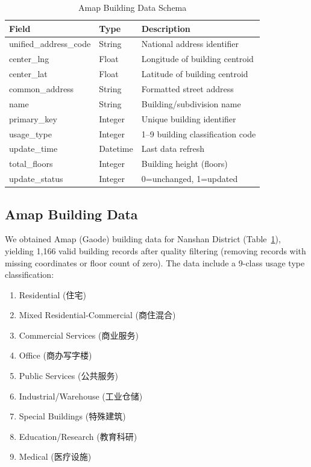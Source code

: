 \documentclass[journal]{IEEEtran}
\begin{document}
\begin{table}[!h]
\caption{Amap Building Data Schema}
\label{tab:schema}
\centering
\begin{tabular}{llp{5.5cm}}
\toprule
\textbf{Field} & \textbf{Type} & \textbf{Description} \\
\midrule
unified\_address\_code & String & National address identifier \\
center\_lng & Float & Longitude of building centroid \\
center\_lat & Float & Latitude of building centroid \\
common\_address & String & Formatted street address \\
name & String & Building/subdivision name \\
primary\_key & Integer & Unique building identifier \\
usage\_type & Integer & 1--9 building classification code \\
update\_time & Datetime & Last data refresh \\
total\_floors & Integer & Building height (floors) \\
update\_status & Integer & 0=unchanged, 1=updated \\
\bottomrule
\end{tabular}
\end{table}

\subsection{Amap Building Data}
We obtained Amap (Gaode) building data for Nanshan District (Table~\ref{tab:schema}), yielding 1,166 valid building records after quality filtering (removing records with missing coordinates or floor count of zero). The data include a 9-class usage type classification:
\begin{enumerate}
    \itemsep0pt
    \item Residential (住宅)
    \item Mixed Residential-Commercial (商住混合)
    \item Commercial Services (商业服务)
    \item Office (商办写字楼)
    \item Public Services (公共服务)
    \item Industrial/Warehouse (工业仓储)
    \item Special Buildings (特殊建筑)
    \item Education/Research (教育科研)
    \item Medical (医疗设施)
\end{enumerate}
\end{document}
